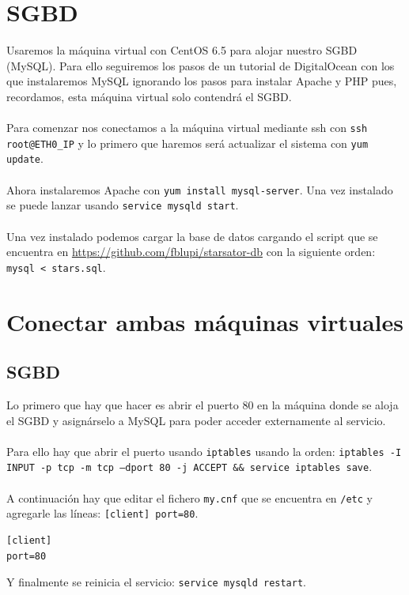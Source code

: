 \section{SGBD}

Usaremos la máquina virtual con CentOS 6.5 para alojar nuestro SGBD (MySQL). Para ello seguiremos los pasos de un tutorial de DigitalOcean \cite{InstallLAMPCentos6.5} con los que instalaremos MySQL ignorando los pasos para instalar Apache y PHP pues, recordamos, esta máquina virtual solo contendrá el SGBD.
\\ \\
Para comenzar nos conectamos a la máquina virtual mediante ssh con \texttt{ssh root@ETH0\_IP} y lo primero que haremos será actualizar el sistema con \texttt{yum update}.
\\ \\
Ahora instalaremos Apache con \texttt{yum install mysql-server}. Una vez instalado se puede lanzar usando \texttt{service mysqld start}.
\\ \\
Una vez instalado podemos cargar la base de datos cargando el script que se encuentra en \url{https://github.com/fblupi/starsator-db} con la siguiente orden: \texttt{mysql < stars.sql}.

\section{Conectar ambas máquinas virtuales}

\subsection{SGBD}

Lo primero que hay que hacer es abrir el puerto 80 en la máquina donde se aloja el SGBD y asignárselo a MySQL para poder acceder externamente al servicio.
\\ \\
Para ello hay que abrir el puerto usando \texttt{iptables} \cite{OpenPortIptables} usando la orden: \texttt{iptables -I INPUT -p tcp -m tcp --dport 80 -j ACCEPT \&\& service iptables save}.
\\ \\
A continuación hay que editar el fichero \texttt{my.cnf} que se encuentra en \texttt{/etc} y agregarle las líneas: \texttt{[client] port=80}. 

\begin{lstlisting}
[client]
port=80
\end{lstlisting}

Y finalmente se reinicia el servicio: \texttt{service mysqld restart}.


\newpage


